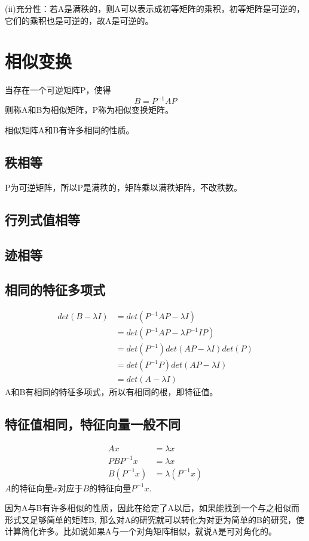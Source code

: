 \documentclass[]{article}
\begin{document}
(ii)充分性：若A是满秩的，则A可以表示成初等矩阵的乘积，初等矩阵是可逆的，它们的乘积也是可逆的，故A是可逆的。

\section{相似变换}
当存在一个可逆矩阵P，使得
\[ 
B = P^{-1}AP
 \]
则称A和B为相似矩阵，P称为相似变换矩阵。

相似矩阵A和B有许多相同的性质。
\subsection{秩相等}
P为可逆矩阵，所以P是满秩的，矩阵乘以满秩矩阵，不改秩数。
\subsection{行列式值相等}
\subsection{迹相等}
\subsection{相同的特征多项式}
\[ 
\begin{aligned}
det(B-\lambda I) &= det(P^{-1}AP - \lambda I) \\
				 &= det(P^{-1}AP - \lambda P^{-1}IP) \\
				 &=	det(P^{-1})det(AP - \lambda I)det(P) \\
				 &= det(P^{-1}P)det(AP - \lambda I) \\
				 &=	det(A - \lambda I)
\end{aligned}
 \]
A和B有相同的特征多项式，所以有相同的根，即特征值。
 
\subsection{特征值相同，特征向量一般不同}
\[ 
\begin{aligned}
Ax &= \lambda x \\
PBP^{-1}x &= \lambda x \\
B(P^{-1}x) &= \lambda (P^{-1}x)
\end{aligned}
 \]
$ A $的特征向量$ x $对应于$ B $的特征向量$ P^{-1}x $.

因为A与B有许多相似的性质，因此在给定了A以后，如果能找到一个与之相似而形式又足够简单的矩阵B, 那么对A的研究就可以转化为对更为简单的B的研究，使计算简化许多。比如说如果A与一个对角矩阵相似，就说A是可对角化的。
\end{document}
